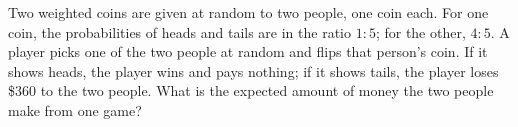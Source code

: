 Two weighted coins are given at random to two people, one coin each. For one coin, the probabilities of heads and tails are in the ratio $1:5$; for the other, $4:5$. A player picks one of the two people at random and flips that person's coin. If it shows heads, the player wins and pays nothing; if it shows tails, the player loses \$360 to the two people. What is the expected amount of money the two people make from one game?
